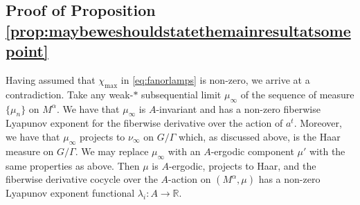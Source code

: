 \documentclass[10pt,reqno]{amsart}
\theoremstyle{Theorem}
\theoremstyle{definition}
\theoremstyle{remark}
\newcommand{\R}{\mathbb {R}}
\begin{document}
{\subsection{Proof of Proposition \ref{prop:maybeweshouldstatethemainresultatsomepoint}}
Having   assumed that $\chi_{\mathrm{max}}$ in \eqref{eq:fanorlamps} is non-zero, we arrive at a contradiction.
Take any weak-$*$ subsequential limit $\mu_\infty$ of the sequence of measure  $\{\mu_n\}$ on $M^\alpha$.  We have that $\mu_\infty$ is $A$-invariant and has a non-zero fiberwise Lyapunov exponent for the fiberwise derivative  over the action of $a^t$.
Moreover, we have that $\mu_\infty$ projects to $\nu_\infty$ on $G/\Gamma$ which, as discussed above, is the Haar measure on $G/\Gamma$.
We may replace $\mu_\infty$ with an $A$-ergodic component $\mu'$ with the same properties as above.  Then $\mu$ is $A$-ergodic, projects to Haar, and the fiberwise derivative cocycle over the $A$-action on $(M^\alpha, \mu)$ has a non-zero Lyapunov exponent functional $\lambda_i\colon A\to \R.  $


}
\end{document}
